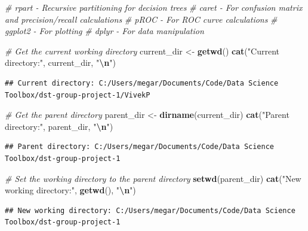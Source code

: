 \documentclass[
]{article}
\newenvironment{Shaded}{\begin{snugshade}}{\end{snugshade}}
\newcommand{\CommentTok}[1]{\textcolor[rgb]{0.56,0.35,0.01}{\textit{#1}}}
\newcommand{\FunctionTok}[1]{\textcolor[rgb]{0.13,0.29,0.53}{\textbf{#1}}}
\newcommand{\NormalTok}[1]{#1}
\newcommand{\OtherTok}[1]{\textcolor[rgb]{0.56,0.35,0.01}{#1}}
\newcommand{\SpecialCharTok}[1]{\textcolor[rgb]{0.81,0.36,0.00}{\textbf{#1}}}
\newcommand{\StringTok}[1]{\textcolor[rgb]{0.31,0.60,0.02}{#1}}
\begin{document}
\begin{Shaded}
\begin{Highlighting}[]
\CommentTok{\# rpart      {-} Recursive partitioning for decision trees}
\CommentTok{\# caret      {-} For confusion matrix and precision/recall calculations}
\CommentTok{\# pROC       {-} For ROC curve calculations}
\CommentTok{\# ggplot2    {-} For plotting}
\CommentTok{\# dplyr      {-} For data manipulation}

\CommentTok{\# Get the current working directory}
\NormalTok{current\_dir }\OtherTok{\textless{}{-}} \FunctionTok{getwd}\NormalTok{()}
\FunctionTok{cat}\NormalTok{(}\StringTok{"Current directory:"}\NormalTok{, current\_dir, }\StringTok{"}\SpecialCharTok{\textbackslash{}n}\StringTok{"}\NormalTok{)}
\end{Highlighting}
\end{Shaded}

\begin{verbatim}
## Current directory: C:/Users/megar/Documents/Code/Data Science Toolbox/dst-group-project-1/VivekP
\end{verbatim}

\begin{Shaded}
\begin{Highlighting}[]
\CommentTok{\# Get the parent directory}
\NormalTok{parent\_dir }\OtherTok{\textless{}{-}} \FunctionTok{dirname}\NormalTok{(current\_dir)}
\FunctionTok{cat}\NormalTok{(}\StringTok{"Parent directory:"}\NormalTok{, parent\_dir, }\StringTok{"}\SpecialCharTok{\textbackslash{}n}\StringTok{"}\NormalTok{)}
\end{Highlighting}
\end{Shaded}

\begin{verbatim}
## Parent directory: C:/Users/megar/Documents/Code/Data Science Toolbox/dst-group-project-1
\end{verbatim}

\begin{Shaded}
\begin{Highlighting}[]
\CommentTok{\# Set the working directory to the parent directory}
\FunctionTok{setwd}\NormalTok{(parent\_dir)}
\FunctionTok{cat}\NormalTok{(}\StringTok{"New working directory:"}\NormalTok{, }\FunctionTok{getwd}\NormalTok{(), }\StringTok{"}\SpecialCharTok{\textbackslash{}n}\StringTok{"}\NormalTok{)}
\end{Highlighting}
\end{Shaded}

\begin{verbatim}
## New working directory: C:/Users/megar/Documents/Code/Data Science Toolbox/dst-group-project-1
\end{verbatim}
\end{document}
